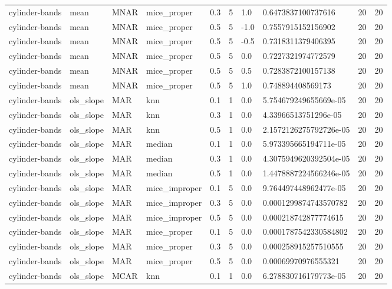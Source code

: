 \begin{tabular}{llllllllll}
cylinder-bands & mean & MNAR & mice\_proper & 0.3 & 5 & 1.0 & 0.6473837100737616 & 20 & 20 \\
cylinder-bands & mean & MNAR & mice\_proper & 0.5 & 5 & -1.0 & 0.7557915152156902 & 20 & 20 \\
cylinder-bands & mean & MNAR & mice\_proper & 0.5 & 5 & -0.5 & 0.7318311379406395 & 20 & 20 \\
cylinder-bands & mean & MNAR & mice\_proper & 0.5 & 5 & 0.0 & 0.7227321974772579 & 20 & 20 \\
cylinder-bands & mean & MNAR & mice\_proper & 0.5 & 5 & 0.5 & 0.7283872100157138 & 20 & 20 \\
cylinder-bands & mean & MNAR & mice\_proper & 0.5 & 5 & 1.0 & 0.748894408569173 & 20 & 20 \\
cylinder-bands & ols\_slope & MAR & knn & 0.1 & 1 & 0.0 & 5.754679249655669e-05 & 20 & 20 \\
cylinder-bands & ols\_slope & MAR & knn & 0.3 & 1 & 0.0 & 4.33966513751296e-05 & 20 & 20 \\
cylinder-bands & ols\_slope & MAR & knn & 0.5 & 1 & 0.0 & 2.1572126275792726e-05 & 20 & 20 \\
cylinder-bands & ols\_slope & MAR & median & 0.1 & 1 & 0.0 & 5.973395665194711e-05 & 20 & 20 \\
cylinder-bands & ols\_slope & MAR & median & 0.3 & 1 & 0.0 & 4.3075949620392504e-05 & 20 & 20 \\
cylinder-bands & ols\_slope & MAR & median & 0.5 & 1 & 0.0 & 1.4478887224566246e-05 & 20 & 20 \\
cylinder-bands & ols\_slope & MAR & mice\_improper & 0.1 & 5 & 0.0 & 9.764497448962477e-05 & 20 & 20 \\
cylinder-bands & ols\_slope & MAR & mice\_improper & 0.3 & 5 & 0.0 & 0.0001299874743570782 & 20 & 20 \\
cylinder-bands & ols\_slope & MAR & mice\_improper & 0.5 & 5 & 0.0 & 0.000218742877774615 & 20 & 20 \\
cylinder-bands & ols\_slope & MAR & mice\_proper & 0.1 & 5 & 0.0 & 0.0001787542330584802 & 20 & 20 \\
cylinder-bands & ols\_slope & MAR & mice\_proper & 0.3 & 5 & 0.0 & 0.000258915257510555 & 20 & 20 \\
cylinder-bands & ols\_slope & MAR & mice\_proper & 0.5 & 5 & 0.0 & 0.00069970976555321 & 20 & 20 \\
cylinder-bands & ols\_slope & MCAR & knn & 0.1 & 1 & 0.0 & 6.278830716179773e-05 & 20 & 20 \\

\end{tabular}

